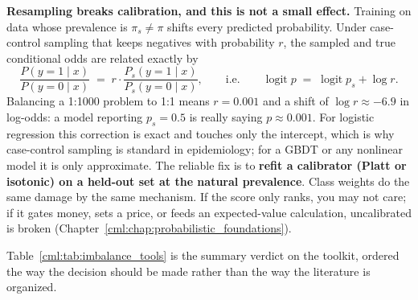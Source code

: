 \begin{warningbox}
\textbf{Resampling breaks calibration, and this is not a small effect.} Training on data whose prevalence is $\pi_s \neq \pi$ shifts every predicted probability. Under case-control sampling that keeps negatives with probability $r$, the sampled and true conditional odds are related exactly by
\begin{equation*}
\frac{P(y=1\mid x)}{P(y=0 \mid x)} \;=\; r \cdot \frac{P_s(y=1\mid x)}{P_s(y=0\mid x)},
\qquad\text{i.e.}\qquad \operatorname{logit} p \;=\; \operatorname{logit} p_s + \log r .
\end{equation*}
Balancing a 1:1000 problem to 1:1 means $r = 0.001$ and a shift of $\log r \approx -6.9$ in log-odds: a model reporting $p_s = 0.5$ is really saying $p \approx 0.001$. For logistic regression this correction is exact and touches only the intercept, which is why case-control sampling is standard in epidemiology; for a GBDT or any nonlinear model it is only approximate. The reliable fix is to \textbf{refit a calibrator (Platt or isotonic) on a held-out set at the natural prevalence}. Class weights do the same damage by the same mechanism. If the score only ranks, you may not care; if it gates money, sets a price, or feeds an expected-value calculation, uncalibrated is broken (Chapter~\ref{cml:chap:probabilistic_foundations}).
\end{warningbox}

Table~\ref{cml:tab:imbalance_tools} is the summary verdict on the toolkit, ordered the way the decision should be made rather than the way the literature is organized.

